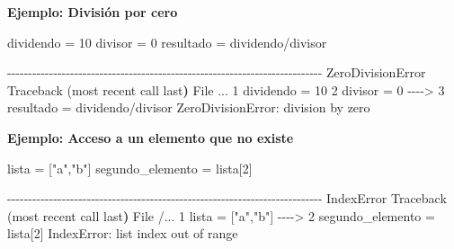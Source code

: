 \documentclass[
  letterpaper,
  DIV=11,
  numbers=noendperiod]{scrreprt}
\newenvironment{Shaded}{\begin{snugshade}}{\end{snugshade}}
\newcommand{\DecValTok}[1]{\textcolor[rgb]{0.68,0.00,0.00}{#1}}
\newcommand{\ErrorTok}[1]{\textcolor[rgb]{0.68,0.00,0.00}{#1}}
\newcommand{\ExtensionTok}[1]{\textcolor[rgb]{0.00,0.23,0.31}{#1}}
\newcommand{\KeywordTok}[1]{\textcolor[rgb]{0.00,0.23,0.31}{\textbf{#1}}}
\newcommand{\NormalTok}[1]{\textcolor[rgb]{0.00,0.23,0.31}{#1}}
\newcommand{\OperatorTok}[1]{\textcolor[rgb]{0.37,0.37,0.37}{#1}}
\newcommand{\PreprocessorTok}[1]{\textcolor[rgb]{0.68,0.00,0.00}{#1}}
\newcommand{\SpecialStringTok}[1]{\textcolor[rgb]{0.13,0.47,0.30}{#1}}
\newcommand{\StringTok}[1]{\textcolor[rgb]{0.13,0.47,0.30}{#1}}
\begin{document}
\textbf{Ejemplo: División por cero}

\begin{Shaded}
\begin{Highlighting}[]
\NormalTok{dividendo }\OperatorTok{=} \DecValTok{10}
\NormalTok{divisor }\OperatorTok{=} \DecValTok{0}
\NormalTok{resultado }\OperatorTok{=}\NormalTok{ dividendo}\OperatorTok{/}\NormalTok{divisor }
\end{Highlighting}
\end{Shaded}

\begin{Shaded}
\begin{Highlighting}[]
\ExtensionTok{{-}{-}{-}{-}{-}{-}{-}{-}{-}{-}{-}{-}{-}{-}{-}{-}{-}{-}{-}{-}{-}{-}{-}{-}{-}{-}{-}{-}{-}{-}{-}{-}{-}{-}{-}{-}{-}{-}{-}{-}{-}{-}{-}{-}{-}{-}{-}{-}{-}{-}{-}{-}{-}{-}{-}{-}{-}{-}{-}{-}{-}{-}{-}{-}{-}{-}{-}{-}{-}{-}{-}{-}{-}{-}{-}}
\ExtensionTok{ZeroDivisionError}\NormalTok{                         Traceback }\ErrorTok{(}\ExtensionTok{most}\NormalTok{ recent call last}\KeywordTok{)}
\ExtensionTok{File}\NormalTok{ ...}
      \ExtensionTok{1}\NormalTok{ dividendo = 10}
      \ExtensionTok{2}\NormalTok{ divisor = 0}
\ExtensionTok{{-}{-}{-}{-}}\OperatorTok{\textgreater{}}\NormalTok{ 3 resultado = dividendo/divisor }
\ExtensionTok{ZeroDivisionError:}\NormalTok{ division by zero}
\end{Highlighting}
\end{Shaded}

\textbf{Ejemplo: Acceso a un elemento que no existe}

\begin{Shaded}
\begin{Highlighting}[]
\NormalTok{lista }\OperatorTok{=}\NormalTok{ [}\StringTok{"a"}\NormalTok{,}\StringTok{"b"}\NormalTok{]}
\NormalTok{segundo\_elemento }\OperatorTok{=}\NormalTok{ lista[}\DecValTok{2}\NormalTok{]}
\end{Highlighting}
\end{Shaded}

\begin{Shaded}
\begin{Highlighting}[]
\ExtensionTok{{-}{-}{-}{-}{-}{-}{-}{-}{-}{-}{-}{-}{-}{-}{-}{-}{-}{-}{-}{-}{-}{-}{-}{-}{-}{-}{-}{-}{-}{-}{-}{-}{-}{-}{-}{-}{-}{-}{-}{-}{-}{-}{-}{-}{-}{-}{-}{-}{-}{-}{-}{-}{-}{-}{-}{-}{-}{-}{-}{-}{-}{-}{-}{-}{-}{-}{-}{-}{-}{-}{-}{-}{-}{-}{-}}
\ExtensionTok{IndexError}\NormalTok{                                Traceback }\ErrorTok{(}\ExtensionTok{most}\NormalTok{ recent call last}\KeywordTok{)}
\ExtensionTok{File}\NormalTok{ /...}
      \ExtensionTok{1}\NormalTok{ lista = }\PreprocessorTok{[}\StringTok{"a"}\SpecialStringTok{,}\StringTok{"b"}\PreprocessorTok{]}
\ExtensionTok{{-}{-}{-}{-}}\OperatorTok{\textgreater{}}\NormalTok{ 2 segundo\_elemento = lista}\PreprocessorTok{[}\SpecialStringTok{2}\PreprocessorTok{]}
\ExtensionTok{IndexError:}\NormalTok{ list index out of range}
\end{Highlighting}
\end{Shaded}
\end{document}
